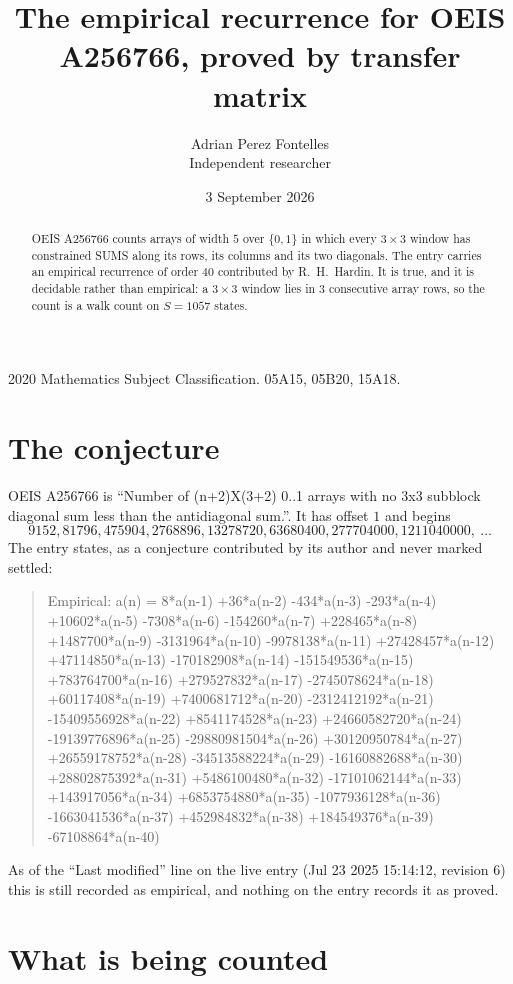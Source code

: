 \documentclass[11pt,a4paper]{article}
\title{The empirical recurrence for OEIS A256766, proved by transfer matrix}
\author{Adrian Perez Fontelles\\ \small Independent researcher}
\date{3 September 2026}
\theoremstyle{plain}
\theoremstyle{definition}
\begin{document}
\maketitle

\begin{abstract}
OEIS A256766 counts arrays of width $5$ over $\{0,1\}$ in which every $3\times3$ window has
constrained SUMS along its rows, its columns and its two diagonals. The entry carries an
empirical recurrence of order $40$ contributed by R.~H.~Hardin. It is true, and it is
decidable rather than empirical: a $3\times3$ window lies in $3$ consecutive array rows,
so the count is a walk count on $S=1057$ states.
\end{abstract}

\noindent\small 2020 Mathematics Subject Classification. 05A15, 05B20, 15A18.\normalsize

\section{The conjecture}

OEIS A256766 is ``Number of (n+2)X(3+2) 0..1 arrays with no 3x3 subblock diagonal sum less than the antidiagonal sum.''. It has offset $1$ and begins
\[
9152, 81796, 475904, 2768896, 13278720, 63680400, 277704000, 1211040000,\ \dots
\]
The entry states, as a conjecture contributed by its author and never marked settled:
\begin{quote}
Empirical: a(n) = 8*a(n-1) +36*a(n-2) -434*a(n-3) -293*a(n-4) +10602*a(n-5) -7308*a(n-6) -154260*a(n-7) +228465*a(n-8) +1487700*a(n-9) -3131964*a(n-10) -9978138*a(n-11) +27428457*a(n-12) +47114850*a(n-13) -170182908*a(n-14) -151549536*a(n-15) +783764700*a(n-16) +279527832*a(n-17) -2745078624*a(n-18) +60117408*a(n-19) +7400681712*a(n-20) -2312412192*a(n-21) -15409556928*a(n-22) +8541174528*a(n-23) +24660582720*a(n-24) -19139776896*a(n-25) -29880981504*a(n-26) +30120950784*a(n-27) +26559178752*a(n-28) -34513588224*a(n-29) -16160882688*a(n-30) +28802875392*a(n-31) +5486100480*a(n-32) -17101062144*a(n-33) +143917056*a(n-34) +6853754880*a(n-35) -1077936128*a(n-36) -1663041536*a(n-37) +452984832*a(n-38) +184549376*a(n-39) -67108864*a(n-40)
\end{quote}
As of the ``Last modified'' line on the live entry (Jul 23 2025 15:14:12, revision 6) this is still
recorded as empirical, and nothing on the entry records it as proved.

\section{What is being counted}
\end{document}
